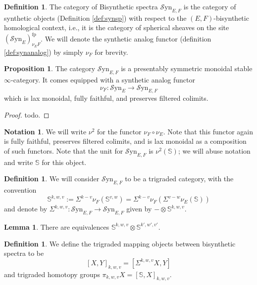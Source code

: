 \documentclass[10pt]{amsart}
\theoremstyle{definition}
\numberwithin{figure}{section}
\numberwithin{equation}{section}
\newtheorem{lemma}[figure]{Lemma}
\newtheorem{proposition}[figure]{Proposition}
\newtheorem{definition}[figure]{Definition}
\newtheorem{notation}[figure]{Notation}
\theoremstyle{cited}
\newcommand{\bS}{\mathbb{S}}
\newcommand{\fp}{\mathrm{fp}}
\newcommand{\Syn}{\mathcal{S}\mathrm{yn}}
\begin{document}
\begin{definition}
  The category of Bisynthetic spectra $\Syn_{E,F}$ is the category of synthetic objects (Definition \ref{def:synsp}) with respect to the $(E,F)$-bisynthetic homological context, i.e., it is the category of spherical sheaves on the site $(\Syn_E)_{\nu_E F}^\fp$. We will denote the synthetic analog functor (definition \ref{def:synanalog}) by simply $\nu_F$ for brevity.
\end{definition}

\begin{proposition}
  The category $\Syn_{E,F}$ is a presentably symmetric monoidal stable $\infty$-category. It comes equipped with a synthetic analog functor
  \[
  \nu_{F}: \Syn_{E}\to \Syn_{E,F}
  \]
  which is lax monoidal, fully faithful, and preserves filtered colimits. 
\end{proposition}

\begin{proof}
  todo.
\end{proof}

\begin{notation}
  We will write $\nu^2$ for the functor $\nu_F\circ \nu_E$. Note that this functor again is fully faithful, preserves filtered colimits, and is lax monoidal as a composition of such functors. Note that the unit for $\Syn_{E,F}$ is $\nu^2(\bS)$; we will abuse notation and write $\bS$ for this object.
\end{notation}

\begin{definition}
  We will consider $\Syn_{E,F}$ to be a trigraded category, with the convention
  \[
  \bS^{k,w,v}:=\Sigma^{k-v}\nu_F(\bS^{v,w})=\Sigma^{k-v}\nu_F(\Sigma^{v-w}\nu_E(\bS))
  \]
  and denote by $\Sigma^{k,w,v}:\Syn_{E,F}\to \Syn_{E,F}$ given by $-\otimes \bS^{k,w,v}$.
\end{definition}

\begin{lemma}
  There are equivalences $\bS^{k,w,v}\otimes \bS^{k',w',v'}$.
\end{lemma}

\begin{definition}
  We define the trigraded mapping objects between bisynthetic spectra to be
  \[
  [X,Y]_{k,w,v}=[\Sigma^{k,w,v}X, Y]
  \]
  and trigraded homotopy groups $\pi_{k,w,v}X=[\bS, X]_{k,w,v}$.
\end{definition}
\end{document}
